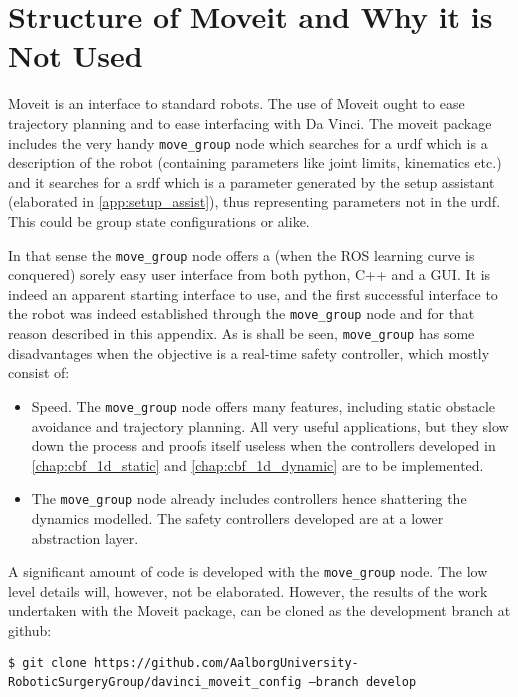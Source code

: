 \section{Structure of Moveit and Why it is Not Used}
Moveit is an interface to standard robots. The use of Moveit ought to ease trajectory planning and to ease interfacing with Da Vinci. The moveit package includes the very handy \texttt{move\_group} node which searches for a \gls{urdf} which is a description of the robot (containing parameters like joint limits, kinematics etc.) and it searches for a \gls{srdf} which is 	a parameter generated by the setup assistant (elaborated in \autoref{app:setup_assist}), thus representing parameters not in the \gls{urdf}. This could be group state configurations or alike.

In that sense the \texttt{move\_group} node offers a (when the ROS learning curve is conquered) sorely easy user interface from both python, C++ and a GUI. It is indeed an apparent starting interface to use, and the first successful interface to the robot was indeed established through the \texttt{move\_group} node and for that reason described in this appendix. As is shall be seen, \texttt{move\_group} has some disadvantages when the objective is a real-time safety controller, which mostly consist of:
\begin{itemize}
\item Speed. The \texttt{move\_group} node offers many features, including static obstacle avoidance and trajectory planning. All very useful applications, but they slow down the process and proofs itself useless when the controllers developed in \autoref{chap:cbf_1d_static} and \autoref{chap:cbf_1d_dynamic} are to be implemented.
\item The \texttt{move\_group} node already includes controllers hence shattering the dynamics modelled. The safety controllers developed are at a lower abstraction layer.
\end{itemize}
A significant amount of code is developed with the \texttt{move\_group} node. The low level details will, however, not be elaborated. However, the results of the work undertaken with the Moveit package, can be cloned as the development branch at github:

\hspace{0cm} \texttt{\$ git clone https://github.com/AalborgUniversity-RoboticSurgeryGroup/davinci\_moveit\_config ---branch develop} \ \ \ {}

